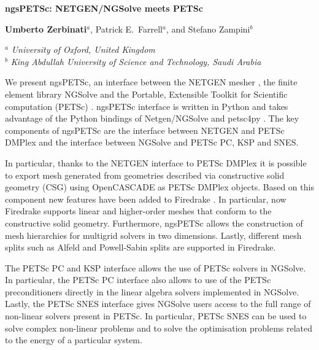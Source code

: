 \documentclass[a4paper,11pt]{article}
\begin{document}

\newpage

\begin{center}
\bgroup
\large
\bf
ngsPETSc: NETGEN/NGSolve meets PETSc
\egroup
\bigskip

\textbf{Umberto Zerbinati}$^a$, Patrick E.~Farrell$^{a}$, and Stefano Zampini$^b$
\medskip

$^a$ {\em University of Oxford, United Kingdom}\\
$^b$ {\em King Abdullah University of Science and Technology, Saudi Arabia}\\
\end{center}
\bigskip

\noindent
We present ngsPETSc, an interface between the NETGEN mesher \cite{netgen}, the finite element library NGSolve \cite{ngsolve} and the Portable, Extensible Toolkit for Scientific computation (PETSc) \cite{petsc}.
ngsPETSc interface is written in Python and takes advantage of the Python bindings of Netgen/NGSolve and petsc4py \cite{petsc4py}.
The key components of ngsPETSc are the interface between NETGEN and PETSc DMPlex and the interface between NGSolve and PETSc PC, KSP and SNES.

In particular, thanks to the NETGEN interface to PETSc DMPlex it is possible to export mesh generated from geometries described via constructive solid geometry (CSG) using OpenCASCADE as PETSc DMPlex objects.
Based on this component new features have been added to Firedrake \cite{firedrake}.
In particular, now Firedrake supports linear and higher-order meshes that conform to the constructive solid geometry.
Furthermore, ngsPETSc allows the construction of mesh hierarchies for multigrid solvers in two dimensions.
Lastly, different mesh splits such as Alfeld and Powell-Sabin splits are supported in Firedrake.

The PETSc PC and KSP interface allows the use of PETSc solvers in NGSolve.
In particular, the PETSc PC interface also allows to use of the PETSc preconditioners directly in the linear algebra solvers implemented in NGSolve.
Lastly, the PETSc SNES interface gives NGSolve users access to the full range of non-linear solvers present in PETSc.
In particular, PETSc SNES can be used to solve complex non-linear problems and to solve the optimisation problems related to the energy of a particular system.
\end{document}
